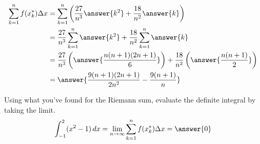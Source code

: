 \documentclass{ximera}
\begin{document}
\begin{exercise}
\begin{exercise}
\begin{exercise}
\begin{exercise}
				\begin{align*}
					\sum_{k=1}^{n} f(x_k^*)\Delta x &=  \sum_{k=1}^{n} \left(\frac{27}{n^3}\answer{k^2} + \frac{18}{n^2}\answer{k}\right)\\
						&= \frac{27}{n^3} \sum_{k=1}^{n} \answer{k^2} + \frac{18}{n^2} \sum_{k=1}^{n} \answer{k}\\
						&= \frac{27}{n^3} \left( \answer{\frac{n(n+1)(2n+1)}{6}}\right) + \frac{18}{n^2} \left( \answer{\frac{n(n+1)}{2}}\right)\\
						&= \answer{\frac{9(n+1)(2n+1)}{2n^2}-\frac{9(n+1)}{n}}
				\end{align*}
				
				\begin{exercise}
					Using what you've found for the Riemann sum, evaluate the definite integral by taking the limit.
					\[ \int_{-1}^{2} (x^2-1) \d x = \lim_{n\to\infty} \sum_{k=1}^{n} f(x_k^*)\Delta x = \answer{0} \]
				\end{exercise}
			\end{exercise}
		\end{exercise}
	\end{exercise}
\end{exercise}
\end{document}
